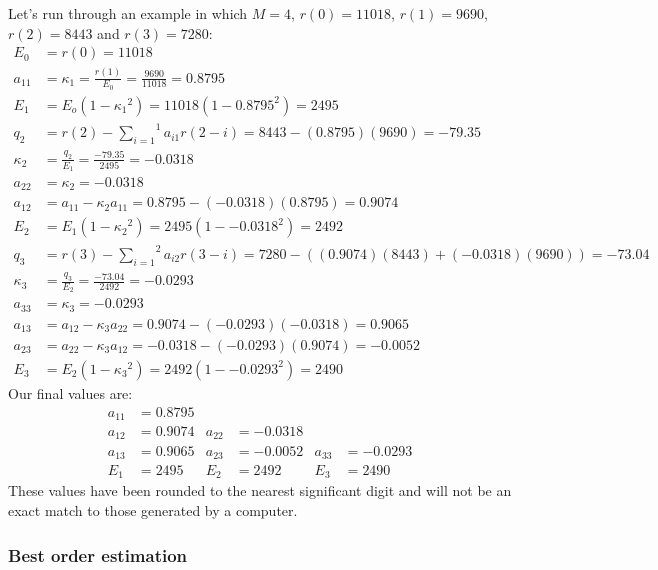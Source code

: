 Let's run through an example in which $M = 4$, $r(0) = 11018$, $r(1) = 9690$,
$r(2) = 8443$ and $r(3) = 7280$:
{
\begin{align*}
E_0 &= r(0) = 11018 \\
a_{11} &= \kappa_1 = \frac{r(1)}{E_0} = \frac{9690}{11018} = 0.8795 \\
E_1 &= E_o(1 - {\kappa_1} ^ 2) = 11018(1 - 0.8795 ^ 2) = 2495 \\
q_2 &= r(2) - \overset{1}{\underset{i = 1}{\sum}} a_{i1}r(2 - i) = 8443 - (0.8795)(9690) = -79.35 \\
\kappa_2 &= \frac{q_2}{E_1} = \frac{-79.35}{2495} = -0.0318 \\
a_{22} &= \kappa_2 = -0.0318 \\
a_{12} &= a_{11} - \kappa_2 a_{11} = 0.8795 - (-0.0318)(0.8795) = 0.9074 \\
E_2 &= E_1 (1 - {\kappa_2} ^ 2 ) = 2495(1 - {-0.0318 ^ 2}) = 2492 \\
q_3 &= r(3) - \overset{2}{\underset{i = 1}{\sum}} a_{i2} r(3 - i) = 7280 - ((0.9074)(8443) + (-0.0318)(9690)) = -73.04 \\
\kappa_3 &= \frac{q_3}{E_2} = \frac{-73.04}{2492} = -0.0293 \\
a_{33} &= \kappa_3 = -0.0293 \\
a_{13} &= a_{12} - \kappa_3 a_{22} = 0.9074 - (-0.0293)(-0.0318) = 0.9065 \\
a_{23} &= a_{22} - \kappa_3 a_{12} = -0.0318 - (-0.0293)(0.9074) = -0.0052 \\
E_3 &= E_2 (1 - {\kappa_3} ^ 2 ) = 2492(1 - {-0.0293 ^ 2}) = 2490
\end{align*}
}
Our final values are:
{
\begin{align*}
a_{11} &= 0.8795 & & & & \\
a_{12} &= 0.9074 & a_{22} &= -0.0318 & & \\
a_{13} &= 0.9065 & a_{23} &= -0.0052 & a_{33} &= -0.0293 \\
E_1 &= 2495 & E_2 &= 2492 & E_3 &= 2490
\end{align*}
}
\noindent
These values have been rounded to the nearest significant digit
and will not be an exact match to those generated by a computer.

\pagebreak

\subsubsection{Best order estimation}

